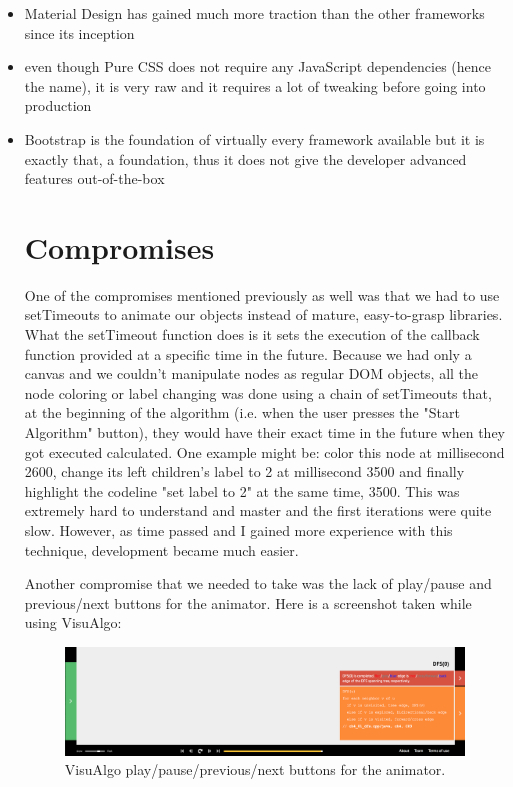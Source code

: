 \documentclass{l4proj}
\begin{document}
\begin{itemize}
    \item Material Design has gained much more traction than the other frameworks since its inception
    \item even though Pure CSS does not require any JavaScript dependencies (hence the name), it is very raw and it
	requires a lot of tweaking before going into production
    \item Bootstrap is the foundation of virtually every framework available but it is exactly that, a foundation, thus
	it does not give the developer advanced features out-of-the-box

\section{Compromises}

One of the compromises mentioned previously as well was that we had to use setTimeouts to animate our objects instead
of mature, easy-to-grasp libraries. What the setTimeout function does is it sets the execution of the callback function
provided at a specific time in the future. Because we had only a canvas and we couldn't manipulate nodes as regular DOM
objects, all the node coloring or label changing was done using a chain of setTimeouts that, at the beginning of the
algorithm (i.e. when the user presses the "Start Algorithm" button), they would have their exact time in the future
when they got executed calculated. One example might be: color this node at millisecond 2600, change its left
children's label to 2 at millisecond 3500 and finally highlight the codeline "set label to 2" at the same time, 3500.
This was extremely hard to understand and master and the first iterations were quite slow. However, as time passed and
I gained more experience with this technique, development became much easier.

Another compromise that we needed to take was the lack of play/pause and previous/next buttons for the animator. Here
is a screenshot taken while using VisuAlgo:

\begin{figure}[!ht]
    \centering
    \includegraphics[scale=0.35]{play-pause-previous-next}
    \caption{VisuAlgo play/pause/previous/next buttons for the animator.}
    \label{fig:play-pause-previous-next}
\end{figure}


\end{itemize}
\end{document}
